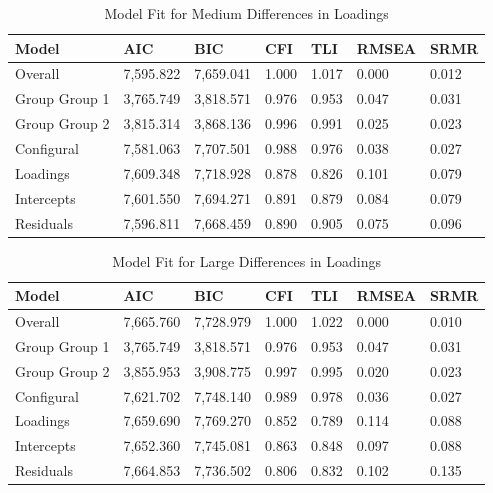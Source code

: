 \documentclass[
  man]{apa7}
\begin{document}
\begin{table}[tbp]

\begin{center}
\begin{threeparttable}

\caption{\label{tab:tab3}Model Fit for Medium Differences in Loadings}

\begin{tabular}{lllllll}
\toprule
Model & AIC & BIC & CFI & TLI & RMSEA & SRMR\\
\midrule
Overall & 7,595.822 & 7,659.041 & 1.000 & 1.017 & 0.000 & 0.012\\
Group Group 1 & 3,765.749 & 3,818.571 & 0.976 & 0.953 & 0.047 & 0.031\\
Group Group 2 & 3,815.314 & 3,868.136 & 0.996 & 0.991 & 0.025 & 0.023\\
Configural & 7,581.063 & 7,707.501 & 0.988 & 0.976 & 0.038 & 0.027\\
Loadings & 7,609.348 & 7,718.928 & 0.878 & 0.826 & 0.101 & 0.079\\
Intercepts & 7,601.550 & 7,694.271 & 0.891 & 0.879 & 0.084 & 0.079\\
Residuals & 7,596.811 & 7,668.459 & 0.890 & 0.905 & 0.075 & 0.096\\
\bottomrule
\end{tabular}

\end{threeparttable}
\end{center}

\end{table}

\begin{table}[tbp]

\begin{center}
\begin{threeparttable}

\caption{\label{tab:tab4}Model Fit for Large Differences in Loadings}

\begin{tabular}{lllllll}
\toprule
Model & AIC & BIC & CFI & TLI & RMSEA & SRMR\\
\midrule
Overall & 7,665.760 & 7,728.979 & 1.000 & 1.022 & 0.000 & 0.010\\
Group Group 1 & 3,765.749 & 3,818.571 & 0.976 & 0.953 & 0.047 & 0.031\\
Group Group 2 & 3,855.953 & 3,908.775 & 0.997 & 0.995 & 0.020 & 0.023\\
Configural & 7,621.702 & 7,748.140 & 0.989 & 0.978 & 0.036 & 0.027\\
Loadings & 7,659.690 & 7,769.270 & 0.852 & 0.789 & 0.114 & 0.088\\
Intercepts & 7,652.360 & 7,745.081 & 0.863 & 0.848 & 0.097 & 0.088\\
Residuals & 7,664.853 & 7,736.502 & 0.806 & 0.832 & 0.102 & 0.135\\
\bottomrule
\end{tabular}

\end{threeparttable}
\end{center}

\end{table}
\end{document}
